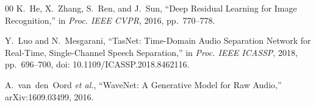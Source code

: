 \documentclass[a4paper,conference]{IEEEtran}
\begin{document}
\begin{thebibliography}{00}
		K.~He, X.~Zhang, S.~Ren, and J.~Sun,
		``Deep Residual Learning for Image Recognition,''
		in \emph{Proc. IEEE CVPR}, 2016, pp.~770--778.
		
		Y.~Luo and N.~Mesgarani,
		``TasNet: Time-Domain Audio Separation Network for Real-Time, Single-Channel Speech Separation,''
		in \emph{Proc. IEEE ICASSP}, 2018, pp.~696--700, doi: 10.1109/ICASSP.2018.8462116.
		
		A.~van~den~Oord \emph{et al.},
		``WaveNet: A Generative Model for Raw Audio,''
		arXiv:1609.03499, 2016.
	\end{thebibliography}
	
\end{document}
